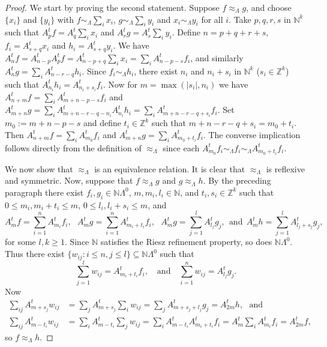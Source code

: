 \documentclass[a4paper, 12pt]{amsart}
\numberwithin{equation}{section}
\theoremstyle{remark}
\theoremstyle{definition}
\begin{document}
\begin{proof}
We start by proving the second statement. Suppose $f\approx_{\Lambda}g$, and choose
$\{x_i\}$ and $\{y_i\}$ with $f\sim_{\Lambda}\sum_i x_i$, $g\sim_{\Lambda}\sum_i y_i$ and
$x_i\sim_{\Lambda} y_i$ for all $i$. Take $p,q,r,s$ in ${\mathbb{N}}^k$ such that
$A^t_pf=A^t_q\sum_i x_i$ and $A^t_rg=A^t_s\sum_i y_i$. Define $n=p+q+r+s$,
$f_i=A^t_{s+q}x_i$ and $h_i=A^t_{s+q}y_i$. We have
$A^t_{n}f=A^t_{n-p}A^t_pf=A^t_{n-p+q}\sum_i x_i=\sum_i A^t_{n-p-s}f_i$, and similarly
$A^t_{n}g=\sum_i A^t_{n-r-q}h_i$. Since $f_i\sim_{\Lambda}h_i$, there exist $n_i$ and
${n_i+s_i}$ in ${\mathbb{N}}^k$ ($s_i\in {\mathbb{Z}}^k$) such that $A^t_{n_i}h_i=A^t_{n_i+s_i}f_i$. Now
for $m=\max(|s_i|,n_i)$ we have $A^t_{n+m}f=\sum_i A^t_{m+n-p-s}f_i$ and
$A^t_{m+n}g=\sum_i A^t_{m+n-r-q-n_i}A^t_{n_i}h_i=\sum_i A^t_{m+n-r-q+s_i}f_i$. Set
$m_0:=m+n-p-s$ and define $t_i\in {\mathbb{Z}}^k$ such that $m+n-r-q+s_i=m_0+t_i$. Then
$A^t_{n+m}f=\sum_i A^t_{m_0}f_i$ and $A^t_{m+n}g=\sum_i A^t_{m_0+t_i}f_i$. The converse
implication follows directly from the definition of $\approx_{\Lambda}$ since each
$A^t_{m_0}f_i\sim_{\Lambda}f_i\sim_{\Lambda}A^t_{m_0+t_i}f_i$.

We now show that $\approx_{\Lambda}$ is  an equivalence relation. It is clear that
$\approx_{\Lambda}$ is reflexive and symmetric. Now, suppose that $f\approx_{\Lambda}g$ and
$g\approx_{\Lambda}h$. By the preceding paragraph there exist $f_i,g_i\in {\mathbb{N}}\Lambda^0$,
$m,m_i,l_i\in {\mathbb{N}}$, and $t_i,s_i\in{\mathbb{Z}}^k$ such that $0\leq m_i,m_i+t_i\leq m$, $0\leq
l_i,l_i+s_i\leq m$, and
$$A^t_mf=\sum_{i=1}^nA^t_{m_i}f_i, \ \ \ A^t_mg=\sum_{i=1}^nA^t_{m_i+t_i}f_i, \ \ \ A^t_mg=\sum_{j=1}^lA^t_{l_j}g_j, \ \ \text{and} \  \ A^t_mh=\sum_{j=1}^lA^t_{l_j+s_j}g_j,$$
for some $l,k\geq 1$. Since ${\mathbb{N}}$ satisfies the Riesz refinement property, so does ${\mathbb{N}}
\Lambda^0$. Thus there exist $\{w_{ij}: i\leq n, j\leq l\}\subseteq {\mathbb{N}}\Lambda^0$ such that
$$\sum_{j=1}^lw_{ij}=A^t_{m_i+t_i}f_i, \quad\text{and}\quad\sum_{i=1}^nw_{ij}=A^t_{l_j}g_j.$$
Now
\begin{align*}
\sum_{ij}A^t_{m+s_j}w_{ij}&=\sum_{j}A^t_{m+s_j}\sum_iw_{ij}=\sum_{j}A^t_{m+s_j+l_j}g_j=A^t_{2m}h,\ \ \ \text{and}\\
\sum_{ij}A^t_{m-t_i}w_{ij}&=\sum_{i}A^t_{m-t_i}\sum_jw_{ij}=\sum_{i}A^t_{m-t_i}A^t_{m_i+t_i}f_i=A^t_m\sum_{i}A^t_{m_i}f_i=A^t_{2m}f,
\end{align*}
so $f\approx_{\Lambda}h$.
\end{proof}
\end{document}
